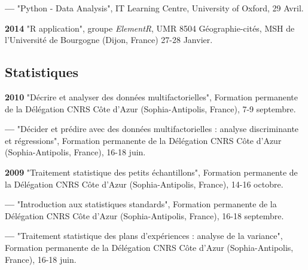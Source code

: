 \documentclass{article}
\newcommand{\fr}[1]{#1}       %
\newcommand{\en}[1]{}     %
\begin{document}
\smallbreak
\textbf{--- }
\fr{"\textsf{Python} - Data Analysis", IT Learning Centre, University of Oxford, 29 Avril.}
\en{"\textsf{Python} - Data Analysis", IT Learning Centre, University of Oxford, April 29.}

\smallbreak
\textbf{2014 }
\fr{"\textsf{R} application", groupe \textit{ElementR}, UMR 8504 G\'{e}ographie-cit\'{e}s, MSH de l'Universit\'{e} de Bourgogne (Dijon, France) 27-28 Janvier.}
\en{"\textsf{R} application", ElementR group, UMR 8504 Géographie-cités, MSH of the University of Bourgogne (Dijon, France), January 27-28.}

\smallbreak

\subsection*{\fr{Statistiques}\en{Statistics}}

\textbf{2010 }
\fr{"Décrire et analyser des données multifactorielles", Formation permanente de la Délégation CNRS Côte d'Azur (Sophia-Antipolis, France), 7-9 septembre.}
\en{"Describing and analyzing multifactorial data", Permanent Training of the CNRS Côte d'Azur Delegation (Sophia-Antipolis, France), September 7-9.}

\smallbreak
\textbf{--- }
\fr{"Décider et prédire avec des données multifactorielles : analyse discriminante et régressions", Formation permanente de la Délégation CNRS Côte d'Azur (Sophia-Antipolis, France), 16-18 juin.}
\en{"Deciding and predicting with multifactorial data: discriminant analysis and regressions", Permanent Training of the CNRS Côte d'Azur Delegation (Sophia-Antipolis, France), June 16-18.}

\smallbreak
\textbf{2009 }
\fr{"Traitement statistique des petits échantillons", Formation permanente de la Délégation CNRS Côte d'Azur (Sophia-Antipolis, France), 14-16 octobre.}
\en{"Statistical processing of small samples", Permanent Training of the CNRS Côte d'Azur Delegation (Sophia-Antipolis, France), October 14-16.}

\smallbreak
\textbf{--- }
\fr{"Introduction aux statistiques standards", Formation permanente de la Délégation CNRS Côte d'Azur (Sophia-Antipolis, France), 16-18 septembre.}
\en{"Introduction to standard statistics", Permanent Training of the CNRS Côte d'Azur Delegation (Sophia-Antipolis, France), September 16-18.}

\smallbreak
\textbf{--- }
\fr{"Traitement statistique des plans d'expériences : analyse de la variance", Formation permanente de la Délégation CNRS Côte d'Azur (Sophia-Antipolis, France), 16-18 juin.}
\en{"Statistical treatment of experimental designs: analysis of variance", Permanent Training of the CNRS Côte d'Azur Delegation (Sophia-Antipolis, France), June 16-18.}
\end{document}
